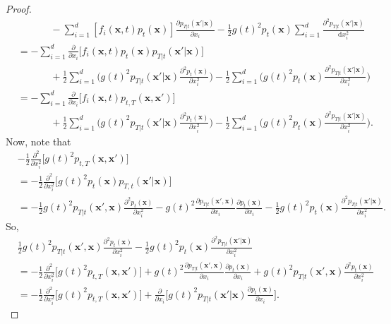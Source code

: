 \documentclass[10pt]{article}
\newcommand{\dee}{\mathrm{d}}
\newcommand{\ve}[1]{\mathbf{#1}}
\begin{document}
\begin{itemize}
\begin{proof}
\begin{align*}
      &\phantom{=} \qquad -\sum_{i=1}^d [f_i(\ve{x},t) p_t(\ve{x})] \frac{\partial p_{T|t}(\ve{x}'|\ve{x})}{\partial x_i} - \frac{1}{2} g(t)^2 p_t(\ve{x}) \sum_{i=1}^d \frac{\partial^2 p_{T|t}(\ve{x}'|\ve{x})}{\dee x_i^2} \\
      &= -\sum_{i=1}^d \frac{\partial}{\partial x_i} \big[ f_i(\ve{x},t) p_t(\ve{x}) p_{T|t}(\ve{x}'|\ve{x}) \big] \\
      &\phantom{=} \qquad + \frac{1}{2} \sum_{i=1}^d \bigg( g(t)^2 p_{T|t}(\ve{x}'|\ve{x}) \frac{\partial^2 p_t(\ve{x})}{\partial x_i^2} \bigg) - \frac{1}{2} \sum_{i=1}^d \bigg( g(t)^2 p_t(\ve{x}) \frac{\partial^2 p_{T|t}(\ve{x}'|\ve{x})}{\partial x_i^2}  \bigg) \\
      &= -\sum_{i=1}^d \frac{\partial}{\partial x_i} \big[ f_i(\ve{x},t) p_{t,T}(\ve{x},\ve{x}') \big] \\
      &\phantom{=} \qquad + \frac{1}{2} \sum_{i=1}^d \bigg( g(t)^2 p_{T|t}(\ve{x}'|\ve{x}) \frac{\partial^2 p_t(\ve{x})}{\partial x_i^2} \bigg) - \frac{1}{2} \sum_{i=1}^d \bigg( g(t)^2 p_t(\ve{x}) \frac{\partial^2 p_{T|t}(\ve{x}'|\ve{x})}{\partial x_i^2}  \bigg).
    \end{align*}
    Now, note that
    \begin{align*}
      &-\frac{1}{2} \frac{\partial^2}{\partial x_i^2} \big[g(t)^2 p_{t,T}(\ve{x},\ve{x}')\big] \\
      &= -\frac{1}{2} \frac{\partial^2}{\partial x_i^2} \big[ g(t)^2 p_t(\ve{x}) p_{T,t}(\ve{x}'|\ve{x}) \big] \\
      &= -\frac{1}{2} g(t)^2 p_{T|t}(\ve{x}',\ve{x}) \frac{\partial^2 p_t(\ve{x})}{\partial x_i^2} 
      - g(t)^2 \frac{\partial p_{T|t}(\ve{x}',\ve{x})}{\partial x_i} \frac{\partial p_t(\ve{x})}{\partial x_i} 
      - \frac{1}{2} g(t)^2 p_t(\ve{x}) \frac{\partial^2 p_{T|t}(\ve{x}'|\ve{x})}{\partial x_i^2}.
    \end{align*}
    So,
    \begin{align*}
      & \frac{1}{2} g(t)^2 p_{T|t}(\ve{x}',\ve{x}) \frac{\partial^2 p_t(\ve{x})}{\partial x_i^2} - \frac{1}{2} g(t)^2 p_t(\ve{x}) \frac{\partial^2 p_{T|t}(\ve{x}'|\ve{x})}{\partial x_i^2} \\
      &= -\frac{1}{2} \frac{\partial^2}{\partial x_i^2} \big[g(t)^2 p_{t,T}(\ve{x},\ve{x}')\big] 
      + g(t)^2 \frac{\partial p_{T|t}(\ve{x}',\ve{x})}{\partial x_i} \frac{\partial p_t(\ve{x})}{\partial x_i} 
      + g(t)^2 p_{T|t}(\ve{x}',\ve{x}) \frac{\partial^2 p_t(\ve{x})}{\partial x_i^2} \\ 
      &= -\frac{1}{2} \frac{\partial^2}{\partial x_i^2} \big[g(t)^2 p_{t,T}(\ve{x},\ve{x}')\big] + \frac{\partial}{\partial x_i} \bigg[ g(t)^2 p_{T|t}(\ve{x}'|\ve{x}) \frac{\partial p_t(\ve{x})}{\partial x_i} \bigg].

\end{align*}
\end{proof}
\end{itemize}
\end{document}
